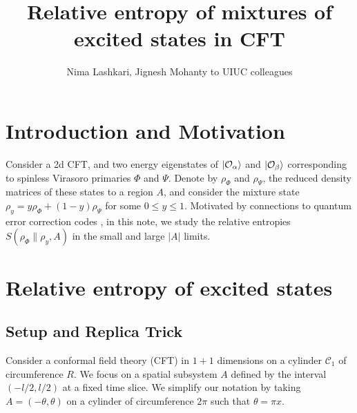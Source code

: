 \documentclass[11pt]{article}
\title{Relative entropy of mixtures of excited states in CFT}
\author{Nima Lashkari, Jignesh Mohanty to UIUC colleagues}
\affiliation{Department of Physics, Purdue University, West Lafayette, IN 47907, USA}
\newcommand{\mO}{\mathcal{O}}
\newcommand{\nn}{\nonumber}
\begin{document}
\maketitle
\flushbottom
  \section{Introduction and Motivation}

  Consider a 2d CFT, and two energy eigenstates of $\ket{\mO_\alpha}$ and
  $\ket{\mO_\beta}$ corresponding to spinless Virasoro primaries $\Phi$ and
  $\Psi$. Denote by $\rho_\Phi$ and $\rho_\Psi$, the reduced density matrices of these states to a region $A$, and consider the mixture state $\rho_y=y\rho_\Phi+(1-y)\rho_\Psi$ for some $0\leq y\leq 1$. Motivated by connections to quantum error correction codes \cite{}, in this note, we study the relative entropies $S(\rho_\Phi\|\rho_y,A)$ in the small and large $|A|$ limits.
  
  

\section{Relative entropy of excited states}

\subsection{Setup and Replica Trick}

  Consider a conformal field theory (CFT) in $1+1$ dimensions on a cylinder
  $\mathcal{C}_{1}$ of circumference $R$. We focus on a spatial subsystem $A$ defined
  by the interval $(-l/2, l/2)$ at a fixed time slice. We simplify our notation
  by taking $A=(-\theta,\theta)$ on a cylinder of circumference $2\pi$ such that
  $\theta=\pi x$.
\end{document}
